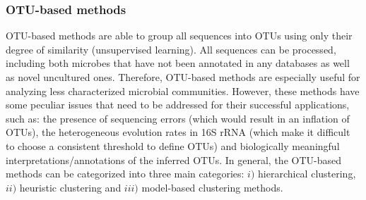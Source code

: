 \subsubsection*{OTU-based methods \label{par:otumet}}
OTU-based methods are able to group all sequences into OTUs using only their degree of similarity (unsupervised learning). All sequences can be processed, including both microbes that have not been annotated in any databases as well as novel uncultured ones. Therefore, OTU-based methods are especially useful for analyzing less characterized microbial communities. However, these methods have some peculiar issues that need to be addressed for their successful applications, such as: the presence of sequencing errors (which would result in an inflation of OTUs), the heterogeneous evolution rates in 16S rRNA (which make it difficult to choose a consistent threshold to define OTUs) and biologically meaningful interpretations/annotations of the inferred OTUs. In general, the OTU-based methods can be categorized into three main categories: $i)$ hierarchical clustering, $ii)$ heuristic clustering and $iii)$ model-based clustering methods.

